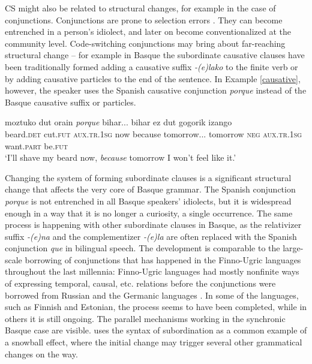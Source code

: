 \documentclass[output=paper]{langscibook}
\begin{document}
CS might also be related to structural changes, for example in the case of conjunctions. Conjunctions are prone to selection errors \parencite{matras2009language}. They can become entrenched in a person’s idiolect, and later on become conventionalized at the community level. Code-switching conjunctions may bring about far-reaching structural change – for example in Basque the subordinate causative clauses have been traditionally formed adding a causative suffix \textit{-(e)lako} to the finite verb or by adding causative particles to the end of the sentence. In Example \ref{causative}, however, the speaker uses the Spanish causative conjunction \textit{porque} instead of the Basque causative suffix or particles.

\begin{exe}
\ex\label{causative}
 {moztuko} {dut} {orain} \textit{porque} {bihar...} {bihar} {ez} {dut} {gogorik} {izango}\\
beard.\textsc{det} cut.\textsc{fut} \textsc{aux.tr.1sg} now because tomorrow... tomorrow \textsc{neg} \textsc{aux.tr.1sg} want.\textsc{part} be.\textsc{fut}\\
\trans `I’ll shave my beard now, \textit{because} tomorrow I won’t feel like it.'
\end{exe}

Changing the system of forming subordinate clauses is a significant structural change that affects the very core of Basque grammar. The Spanish conjunction \textit{porque} is not entrenched in all Basque speakers' idiolects,  but it is widespread enough in a way that it is no longer a curiosity, a single occurrence. The same process is happening with other subordinate clauses in Basque, as the relativizer suffix \textit{-(e)na} and the complementizer \textit{-(e)la} are often replaced with the Spanish conjunction \textit{que} in bilingual speech. The development is comparable to the large-scale borrowing of conjunctions that has happened in the Finno-Ugric languages throughout the last millennia: Finno-Ugric languages had mostly nonfinite ways of expressing temporal, causal, etc. relations before the conjunctions were borrowed from Russian and the Germanic languages \parencite{hickey2010handbook}. In some of the languages, such as Finnish and Estonian, the process seems to have been completed, while in others it is still ongoing. The parallel mechanisms working in the synchronic Basque case are visible. \textcite[62]{thomason2001contact} uses the syntax of subordination as a common example of a snowball effect, where the initial change may trigger several other grammatical changes on the way. 
\end{document}
